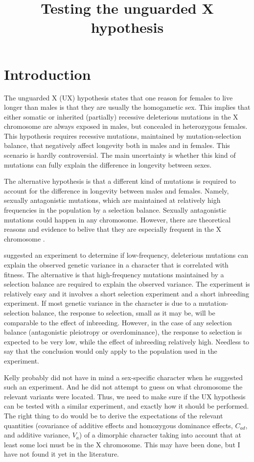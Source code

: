 \documentclass[a4paper,12pt]{article}
\title{Testing the unguarded X hypothesis}
\begin{document}
\maketitle
\section{Introduction}
The unguarded X (UX) hypothesis states that one reason for females to live longer than males is that they are usually the homogametic sex. This implies that either somatic or inherited (partially) recessive deleterious mutations in the X chromosome are always exposed in males, but concealed in heterozygous females. This hypothesis requires recessive mutations, maintained by mutation-selection balance, that negatively affect longevity both in males and in females. This scenario is hardly controversial. The main uncertainty is whether this kind of mutations can fully explain the difference in longevity between sexes.

The alternative hypothesis is that a different kind of mutations is required to account for the difference in longevity between males and females. Namely, sexually antagonistic mutations, which are maintained at relatively high frequencies in the population by a selection balance. Sexually antagonistic mutations could happen in any chromosome. However, there are theoretical reasons and evidence to belive that they are especially frequent in the X chromosome \citep{Gibson2002}.

\citet{Kelly1999} suggested an experiment to determine if low-frequency, deleterious mutations can explain the observed genetic variance in a character that is correlated with fitness. The alternative is that high-frequency mutations maintained by a selection balance are required to explain the observed variance. The experiment is relatively easy and it involves a short selection experiment and a short inbreeding experiment. If most genetic variance in the character is due to a mutation-selection balance, the response to selection, small as it may be, will be comparable to the effect of inbreeding. However, in the case of any selection balance (antagonistic pleiotropy or overdominance), the response to selection is expected to be very low, while the effect of inbreeding relatively high. Needless to say that the conclusion would only apply to the population used in the experiment.

Kelly probably did not have in mind a sex-specific character when he suggested such an experiment. And he did not attempt to guess on what chromosome the relevant variants were located. Thus, we need to make sure if the UX hypothesis can be tested with a similar experiment, and exactly how it should be performed. The right thing to do would be to derive the expectations of the relevant quantities (covariance of additive effects and homozygous dominance effects, $C_{ad}$, and additive variance, $V_a$) of a dimorphic character taking into account that at least some loci must be in the X chromosome. This may have been done, but I have not found it yet in the literature.
\end{document}
